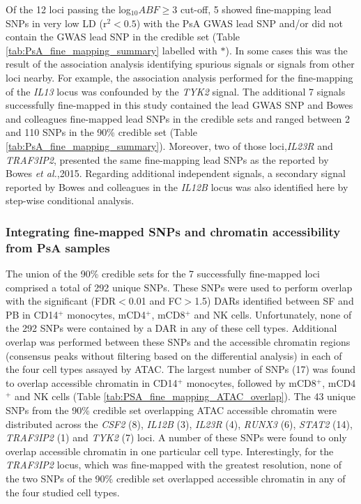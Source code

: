 Of the 12 loci passing the log${_10}ABF\geq3$ cut-off, 5 showed fine-mapping lead SNPs in very low LD (r${^2}<0.5$) with the PsA GWAS lead SNP and/or did not contain the GWAS lead SNP in the credible set (Table \ref{tab:PsA_fine_mapping_summary} labelled with $\ast$). In some cases this was the result of the association analysis identifying spurious signals or signals from other loci nearby. For example, the association analysis performed for the fine-mapping of the \textit{IL13} locus was confounded by the \textit{TYK2} signal. The additional 7 signals successfully fine-mapped in this study contained the lead GWAS SNP and Bowes and colleagues fine-mapped lead SNPs in the credible sets and ranged between 2 and 110 SNPs in the 90\% credible set (Table \ref{tab:PsA_fine_mapping_summary}). Moreover, two of those loci,\textit{IL23R} and \textit{TRAF3IP2}, presented the same fine-mapping lead SNPs as the reported by Bowes \textit{et al.},2015. Regarding additional independent signals, a secondary signal reported by Bowes and colleagues in the \textit{IL12B} locus was also identified here by step-wise conditional analysis. 


\subsubsection{Integrating fine-mapped SNPs and chromatin accessibility from PsA samples}
The union of the 90\% credible sets for the 7 successfully fine-mapped loci comprised a total of 292 unique SNPs. These SNPs were used to perform overlap with the significant (FDR$<$0.01 and FC$>$1.5) DARs identified between SF and PB in CD14$^+$ monocytes, mCD4$^+$, mCD8$^+$ and NK cells. Unfortunately, none of the 292 SNPs were contained by a DAR in any of these cell types. Additional overlap was performed between these SNPs and the accessible chromatin regions (consensus peaks without filtering based on the differential analysis) in each of the four cell types assayed by ATAC. The largest number of SNPs (17) was found to overlap accessible chromatin in CD14$^+$ monocytes, followed by mCD8$^+$, mCD4$^+$ and NK cells (Table \ref{tab:PSA_fine_mapping_ATAC_overlap}). The 43 unique SNPs from the 90\% credible set overlapping ATAC accessible chromatin were distributed across the \textit{CSF2} (8), \textit{IL12B} (3), \textit{IL23R} (4), \textit{RUNX3} (6), \textit{STAT2} (14), \textit{TRAF3IP2} (1) and \textit{TYK2} (7) loci. A number of these SNPs were found to only overlap accessible chromatin in one particular cell type. Interestingly, for the \textit{TRAF3IP2} locus, which was fine-mapped with the greatest resolution, none of the two SNPs of the 90\% credible set overlapped accessible chromatin in any of the four studied cell types.



